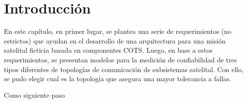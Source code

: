 \section{Introducción}
\begin{comment}
Los proyectos aeroespaciales emplean una arquitectura de aviónica que se denomina \textbf{federada}, en la cual cada computadora del sistema se diseña para que desarrolle una sola función específica \citep{Loveless15}. Esta estrategia de diseño tiene varias ventajas, por tal motivo ha sido utilizada a lo largo de los años. En contraposición, cuenta con varias desventajas, que alientan al surgimiento de nuevas formas de pensamiento y desarrollo de aviónica de sistemas espaciales. Algunas de estas desventajas que ya fueron mencionadas con anterioridad son la masa y una utilización ineficiente de los procesadores. Para ello se está comenzando a desarrollar arquitecturas con el paradigma IMA.
\end{comment}

En este capítulo, en primer lugar, se plantea una serie de requerimientos (no estrictos) que ayudan en el desarrollo de una arquitectura para una misión satelital ficticia basada en componentes COTS. Luego, en base a estos requerimientos, se presentan modelos para la medición de confiabilidad de tres tipos diferentes de topologías de comunicación de subsistemas satelital. Con ello, se pudo elegir cual es la topología que asegura una mayor tolerancia a fallas.

Como siguiente paso 

